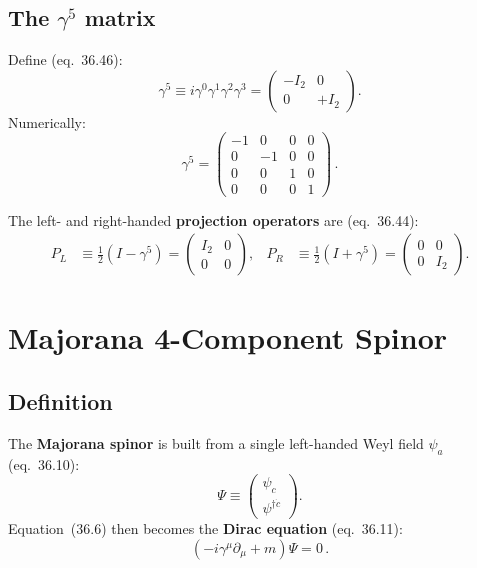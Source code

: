 \subsection{The \texorpdfstring{$\gamma^5$}{gamma5} matrix}

Define (eq.~36.46):
\begin{equation}
  \gamma^5 \equiv i\gamma^0\gamma^1\gamma^2\gamma^3
  = \begin{pmatrix}-I_2 & 0 \\ 0 & +I_2\end{pmatrix}.
  \tag{36.43}
\end{equation}
Numerically:
\[
  \gamma^5 = \begin{pmatrix}-1 & 0 & 0 & 0 \\ 0 & -1 & 0 & 0 \\ 0 & 0 & 1 & 0 \\ 0 & 0 & 0 & 1\end{pmatrix}\,.
\]

\medskip
\noindent The left- and right-handed \textbf{projection operators} are (eq.~36.44):
\begin{align}
  P_L &\equiv \tfrac{1}{2}(I - \gamma^5)
     = \begin{pmatrix}I_2&0\\0&0\end{pmatrix},
  &
  P_R &\equiv \tfrac{1}{2}(I + \gamma^5)
     = \begin{pmatrix}0&0\\0&I_2\end{pmatrix}.
  \tag{36.44}
\end{align}

\section{Majorana 4-Component Spinor}

\subsection{Definition}

The \textbf{Majorana spinor} is built from a single left-handed Weyl field $\psi_a$
(eq.~36.10):
\begin{equation}
  \Psi \equiv \begin{pmatrix}\psi_c\\\psi^{\dagger\dot{c}}\end{pmatrix}.
  \tag{36.10}
\end{equation}
Equation~(36.6) then becomes the \textbf{Dirac equation} (eq.~36.11):
\begin{equation}
  \boxed{(-i\gamma^\mu\partial_\mu + m)\Psi = 0\,.}
  \tag{36.11}
\end{equation}

